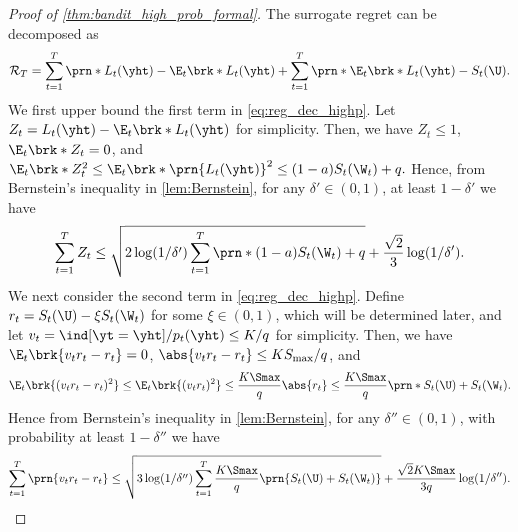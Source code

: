 \begin{proof}[Proof of \cref{thm:bandit_high_prob_formal}]
The surrogate regret can be decomposed as
\begin{equation}\label{eq:reg_dec_highp}
    \mathcal{R}_T 
    =
    \sum_{t=1}^T \prn*{ L_t(\yht) - \E_t\brk*{ L_t(\yht)} }
    +
    \sum_{t=1}^T \prn*{ \E_t\brk*{ L_t(\yht)} - S_t(\U) }
    .
\end{equation}
We first upper bound the first term in \eqref{eq:reg_dec_highp}.
Let $Z_t = L_t(\yht) - \E_t\brk*{ L_t(\yht)}$ for simplicity.
Then, we have $Z_t \leq 1$, $\E_t\brk*{Z_t} = 0$, and
$\E_t\brk*{Z_t^2} 
\leq 
\E_t\brk*{ \prn{L_t(\yht)}^2 }
\leq 
(1-a) S_t(\W_t) + q.
$
Hence, from Bernstein's inequality in \cref{lem:Bernstein}, for any $\delta' \in (0,1)$, at least $1 - \delta'$ we have 
\begin{equation}\label{eq:conc_zt}
    \sum_{t=1}^T Z_t
    \leq 
    \sqrt{2 \log (1/\delta') \sum_{t=1}^T \prn*{(1-a) S_t(\W_t) + q} }
    +
    \frac{\sqrt{2}}{3} \log (1/\delta')
    .
\end{equation}
We next consider the second term in \eqref{eq:reg_dec_highp}.
Define $r_t = S_t(\U) - \xi S_t(\W_t)$ for some $\xi \in (0, 1)$, which will be determined later,
and let $v_t = \ind[ \yt = \yht ] / p_t(\yht) \leq K/q$ for simplicity.
Then, we have $\E_t\brk{v_t r_t - r_t} = 0$, $\abs{v_t r_t - r_t} \leq K S_{\max} / q$, and
\begin{equation}
    \E_t\brk{ (v_t r_t - r_t)^2}
    \leq
    \E_t\brk{(v_t r_t)^2}
    \leq 
    \frac{K \Smax}{q} \abs{r_t}
    \leq 
    \frac{K \Smax}{q} \prn*{S_t(\U) + S_t(\W_t)}
    .
    \nonumber
\end{equation}
Hence from Bernstein's inequality in \cref{lem:Bernstein}, for any $\delta'' \in (0,1)$, with probability at least $1 - \delta''$ we have 
\begin{equation}\label{eq:conc_vr}
    \sum_{t=1}^T \prn{v_t r_t - r_t} 
    \leq 
    \sqrt{3 \log (1/\delta'') \sum_{t=1}^T \frac{K \Smax}{q} \prn{S_t(\U) + S_t(\W_t)} }
    +
    \frac{\sqrt{2} K \Smax}{3q} \log(1/\delta'')
    .
\end{equation}



\end{proof}
